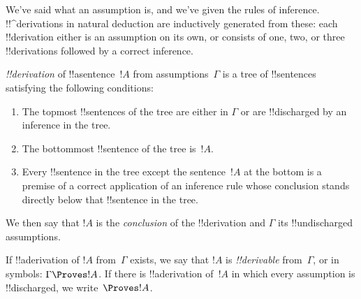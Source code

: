 \documentclass[../../../include/open-logic-section]{subfiles}
\begin{document}
      {}
      {}


\begin{explain}
We've said what an assumption is, and we've given the rules of
inference.  !!^{derivation}s in natural deduction are inductively
generated from these: each !!{derivation} either is an assumption
on its own, or consists of one, two, or three !!{derivation}s followed
by a correct inference.
\end{explain}

\begin{defn}[!!^{derivation}]
 \emph{!!{derivation}} of !!a{sentence}~$!A$ from assumptions~$\Gamma$
is a tree of !!{sentence}s satisfying the following conditions:
\begin{enumerate}
\item The topmost !!{sentence}s of the tree are either in $\Gamma$ or
  are !!{discharged} by an inference in the tree.
\item The bottommost !!{sentence} of the tree is~$!A$.
\item Every !!{sentence} in the tree except the sentence~$!A$ at
  the bottom is a premise of a correct application of an inference
  rule whose conclusion stands directly below that !!{sentence} in the
  tree.
\end{enumerate}
We then say that $!A$ is the \emph{conclusion} of the !!{derivation}
and $\Gamma$ its !!{undischarged} assumptions.

If !!a{derivation} of $!A$ from~$\Gamma$ exists, we say that $!A$ is
\emph{!!{derivable}} from~$\Gamma$, or in symbols: $\Gamma \Proves
!A$. If there is !!a{derivation} of~$!A$ in which every assumption is
!!{discharged}, we write~$\Proves !A$.
\end{defn}
\end{document}
